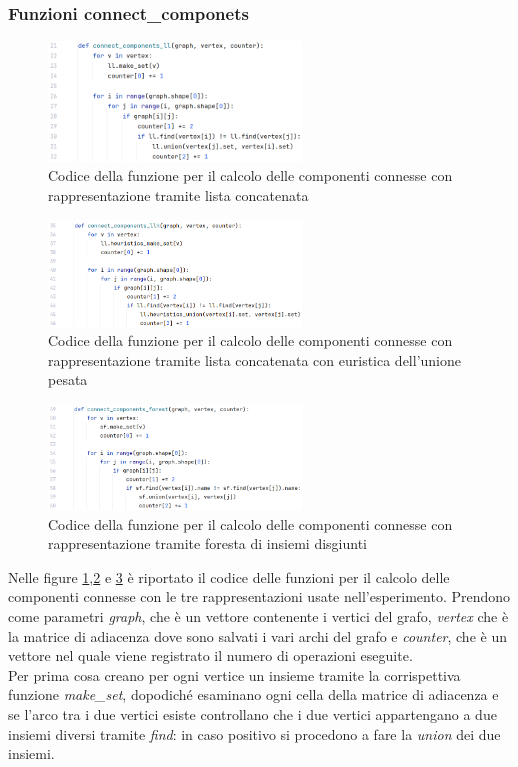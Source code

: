 \documentclass[12pt]{article}
\begin{document}
\subsubsection{Funzioni connect\_componets}
\begin{figure}[h]
    \centering
    \includegraphics[width=0.6\textwidth]{images/main_code_images/connect_components_ll.png}
    \caption{Codice della funzione per il calcolo delle componenti connesse con rappresentazione tramite lista concatenata}
    \label{fig:cc_ll}
\end{figure}
\begin{figure}[h]
    \centering
    \includegraphics[width=0.6\textwidth]{images/main_code_images/connect_components_llh.png}
    \caption{Codice della funzione per il calcolo delle componenti connesse con rappresentazione tramite lista concatenata con euristica dell'unione pesata}
    \label{fig:cc_llh}
\end{figure}
\begin{figure}[h]
    \centering
    \includegraphics[width=0.6\textwidth]{images/main_code_images/connect_components_sf.png}
    \caption{Codice della funzione per il calcolo delle componenti connesse con rappresentazione tramite foresta di insiemi disgiunti}
    \label{fig:cc_sf}
\end{figure}
Nelle figure \ref{fig:cc_ll},\ref{fig:cc_llh} e \ref{fig:cc_sf} è riportato il codice delle funzioni per il calcolo delle componenti connesse con le tre rappresentazioni usate nell'esperimento.
Prendono come parametri \textit{graph}, che è un vettore contenente i vertici del grafo, \textit{vertex} che è la matrice di adiacenza dove sono salvati i vari archi del grafo e \textit{counter}, che è un vettore nel quale viene registrato il numero di operazioni eseguite.\\
Per prima cosa creano per ogni vertice un insieme tramite la corrispettiva funzione \textit{make\_set}, dopodiché esaminano ogni cella della matrice di adiacenza e se l'arco tra i due vertici esiste controllano che i due vertici appartengano a due insiemi diversi tramite \textit{find}: in caso positivo si procedono a fare la \textit{union} dei due insiemi.
\end{document}
